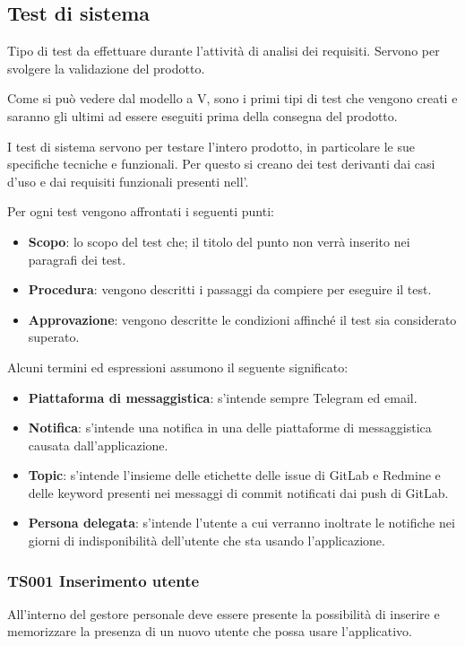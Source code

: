 \subsection{Test di sistema}
Tipo di test da effettuare durante l'attività di analisi dei requisiti. Servono per svolgere la validazione del prodotto.

Come si può vedere dal modello a V, sono i primi tipi di test che vengono creati e saranno gli ultimi ad essere eseguiti prima della consegna del prodotto.

I test di sistema servono per testare l'intero prodotto, in particolare le sue specifiche tecniche e funzionali.
Per questo si creano dei test derivanti dai casi d'uso e dai requisiti funzionali presenti nell'\AdRd.

Per ogni test vengono affrontati i seguenti punti:

\begin{itemize}
	\item \textbf{Scopo}: lo scopo del test che; il titolo del punto non verrà inserito nei paragrafi dei test. %
	\item \textbf{Procedura}: vengono descritti i passaggi da compiere per eseguire il test.
	\item \textbf{Approvazione}: vengono descritte le condizioni affinché il test sia considerato superato.
\end{itemize}

Alcuni termini ed espressioni assumono il seguente significato:

\begin{itemize}
	\item \textbf{Piattaforma di messaggistica}: s'intende sempre Telegram ed email.
	\item \textbf{Notifica}: s'intende una notifica in una delle piattaforme di messaggistica causata dall'applicazione.
	\item \textbf{Topic}: s'intende l'insieme delle etichette delle issue di GitLab e Redmine e delle keyword presenti nei messaggi di commit notificati dai push di GitLab.
	\item \textbf{Persona delegata}: s'intende l'utente a cui verranno inoltrate le notifiche nei giorni di indisponibilità dell'utente che sta usando l'applicazione. 
\end{itemize}

	\subsubsection{TS001 Inserimento utente}
		All'interno del gestore personale deve essere presente la possibilità di inserire e memorizzare la presenza di un nuovo utente che possa usare l'applicativo.
		
